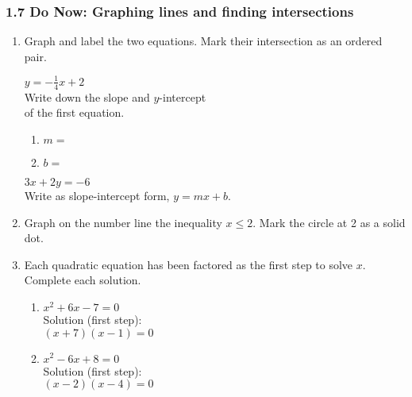 \documentclass[12pt, twoside]{article}
\begin{document}
\subsubsection*{1.7 Do Now: Graphing lines and finding intersections}
\begin{enumerate}
  \item Graph and label the two equations. Mark their intersection as an ordered pair.

  \begin{multicols}{2}
    $y = -\frac{1}{4}x+2$ \\[0.25cm]
    Write down the slope and $y$-intercept\\ of the first equation.
    \begin{enumerate}
      \item $m=$ \bigskip
      \item $b=$
    \end{enumerate}
    \columnbreak
    $3x+2y = -6$ \\[0.5cm]
        Write as slope-intercept form, $y=mx+b$.
    \end{multicols}

  \begin{center} %
  \end{center}

  \item Graph on the number line the inequality $x \leq 2$. Mark the circle at 2 as a solid dot. \vspace{0.5cm}
    \begin{center}
      \end{center}
      \newpage
      \item Each quadratic equation has been factored as the first step to solve $x$. Complete each solution.
      \begin{multicols}{2}
        \begin{enumerate}[itemsep=5cm]
          \item $x^2 + 6x - 7 = 0$ \\[0.5cm]
            Solution (first step): \\
            $(x + 7)(x - 1) = 0$
          \item $x^2 - 6x + 8 = 0$ \\[0.5cm]
            Solution (first step): \\
            $(x - 2)(x - 4) = 0$
          \end{enumerate}
          \end{multicols} \vspace{2cm}


\end{enumerate}
\end{document}
